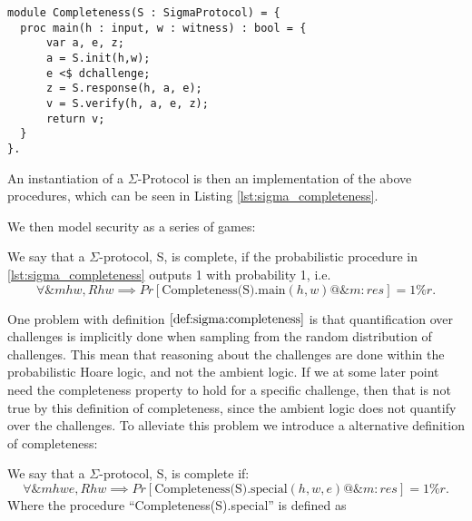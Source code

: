 
\begin{lstlisting}[float, label=lst:sigma_completeness,caption=Completeness game for $\Sigma$-Protocols]
module Completeness(S : SigmaProtocol) = {
  proc main(h : input, w : witness) : bool = {
      var a, e, z;
      a = S.init(h,w);
      e <$ dchallenge;
      z = S.response(h, a, e);
      v = S.verify(h, a, e, z);
      return v;
  }
}.
\end{lstlisting}

An instantiation of a $\Sigma$-Protocol is then an implementation of the above
procedures, which can be seen in Listing \ref{lst:sigma_completeness}.

We then model security as a series of games:

\begin{definition}[Completeness]
\label{def:sigma:completeness}
  We say that a $\Sigma$-protocol, S, is complete, if the probabilistic procedure in
  \ref{lst:sigma_completeness} outputs 1 with probability 1, i.e.
  \begin{equation}
    \label{eq:sigma_completeness}
    \forall \&m h w, R h w \implies Pr[\text{Completeness(S).main}(h,w) @ \&m : res] = 1\%r.
  \end{equation}
\end{definition}

One problem with definition $\ref{def:sigma:completeness}$ is that
quantification over challenges is implicitly done when sampling from the random
distribution of challenges. This mean that reasoning about the challenges are
done within the probabilistic Hoare logic, and not the ambient logic. If we at
some later point need the completeness property to hold for a specific
challenge, then that is not true by this definition of completeness, since
the ambient logic does not quantify over the challenges. To alleviate this
problem we introduce a alternative definition of completeness:

\begin{definition}
\label{def:sigma:alt_completeness}
  We say that a $\Sigma$-protocol, S, is complete if:
  \begin{equation}
    \label{eq:sigma_completeness}
    \forall \&m h w e, R h w \implies Pr[\text{Completeness(S).special}(h,w,e) @ \&m : res] = 1\%r.
  \end{equation}
  Where the procedure ``Completeness(S).special'' is defined as
  
\end{definition}

